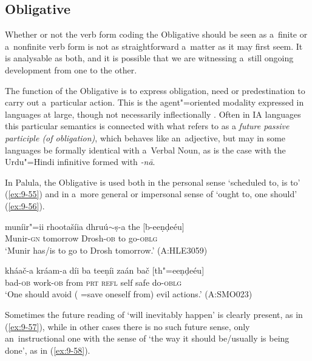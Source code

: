 \subsection{Obligative}
\label{subsec:9-2-3}

Whether or not the verb form coding the Obligative should be seen as a~finite or a~nonfinite verb form is not as straightforward a~matter as it may first seem. It is analysable as both, and it is possible that we are witnessing a~still ongoing development from one to the other. 



The function of the Obligative is to express obligation, need or predestination to carry out a~particular action. This is the agent"=oriented modality expressed in languages at large, though not necessarily inflectionally \citep[177--187]{bybeeetal1994}. Often in IA languages this particular semantics is connected with what \citet[322]{masica1991} refers to as a \textit{future passive participle (of obligation)}, which behaves like an~adjective, but may in some languages be formally identical with a~Verbal Noun, as is the case with the Urdu"=Hindi infinitive formed with \textit{-nā}. 



In Palula, the Obligative is used both in the personal sense `scheduled to, is to' (\ref{ex:9-55}) and in a~more general or impersonal sense of `ought to, one should' (\ref{ex:9-56}).

\begin{exe}
\ex
\label{ex:9-55}
\gll muníir"=ii rhootašíia dhruú$\sim$ṣ-a the [b-eeṇḍeéu] \\
Munir-\textsc{gn } tomorrow Drosh-\textsc{ob} to go-\textsc{oblg} \\
\glt `Munir has/is to go to Drosh tomorrow.' (A:HLE3059)

\ex
\label{ex:9-56}
\gll kháač-a kráam-a díi ba teeṇíi zaán bač [th"=eeṇḍeéu] \\
bad-\textsc{ob} work-\textsc{ob} from \textsc{prt} \textsc{refl} self safe do-\textsc{oblg} \\
\glt `One should avoid ( =save oneself from) evil actions.' (A:SMO023)
\end{exe}

Sometimes the future reading of `will inevitably happen' is clearly present, as in (\ref{ex:9-57}), while in other cases there is no such future sense, only an~instructional one with the sense of `the way it should be/usually is being done', as in (\ref{ex:9-58}).

